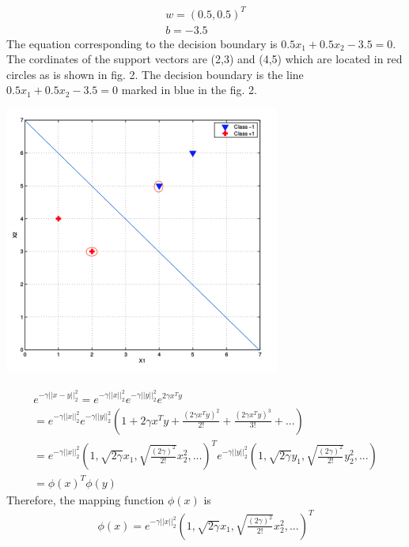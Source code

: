 \documentclass[12pt]{article}
\newenvironment{solution}[2][Solution]{\begin{trivlist}
\item[\hskip \labelsep {\bfseries #1}\hskip \labelsep {\bfseries #2.}]}{\end{trivlist}}
\begin{document}
\begin{solution}{2}
\begin{align*}
w = (0.5, 0.5)^T\\
b = -3.5
\end{align*}
The equation corresponding to the decision boundary is $0.5x_1 + 0.5x_2 - 3.5 = 0$. \\
The cordinates of the support vectors are (2,3) and (4,5) which are located in red circles as is shown in fig. 2. The decision boundary is the line $0.5x_1 + 0.5x_2 - 3.5 = 0$ marked in blue in the fig. 2. \\
\begin{center}
\includegraphics[angle = 0, width = .7\textwidth]{./images/fig2.png}
\end{center}
\end{solution}

\begin{solution}{3}
\begin{align*}
e^{- \gamma ||x - y ||_{2}^2} = e^{- \gamma ||x||_{2}^{2}}e^{- \gamma ||y||_{2}^{2}}e^{ 2\gamma x^{T}y}\\
= e^{- \gamma ||x||_{2}^{2}}e^{- \gamma ||y||_{2}^{2}} (1 + 2\gamma x^{T}y + \frac{(2\gamma x^{T}y)^2}{2!} + \frac{(2\gamma x^{T}y)^3}{3!} + ...)\\
= e^{- \gamma ||x||_{2}^{2}}(1, \sqrt{2\gamma} x_1, \sqrt{\frac{(2 \gamma)^2}{2!}}x_2^{2}, ...)^{T} e^{- \gamma ||y||_{2}^{2}}(1, \sqrt{2\gamma} y_1, \sqrt{\frac{(2 \gamma)^2}{2!}}y_2^{2}, ...)\\
= \phi(x)^{T}\phi(y)
\end{align*}
Therefore, the mapping function $\phi(x)$ is
\begin{align*}
\phi (x) = e^{- \gamma ||x||_{2}^{2}}(1, \sqrt{2\gamma} x_1, \sqrt{\frac{(2 \gamma)^2}{2!}}x_2^{2}, ...)^{T}
\end{align*}
\end{solution}
\end{document}
